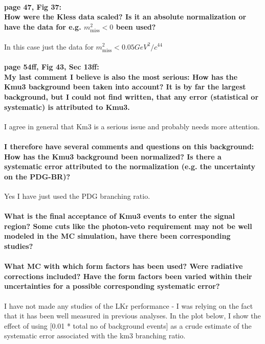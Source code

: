 \documentclass[12pt]{report}
\begin{document}
\paragraph{page 47, Fig 37: \\
    How were the Kless data scaled? Is it an absolute normalization or have the data for e.g. $m_\textrm{miss}^2 < 0$ been used?\\
}
In this case just the data for $m_\textrm{miss}^2 < 0.05 GeV^2/c^44$

\paragraph{page 54ff, Fig 43, Sec 13ff:\\
My last comment I believe is also the most serious: How has the Kmu3 background been taken into account? It is by far the largest background, but I could not find written, that any error (statistical or systematic) is attributed to Kmu3.\\}
I agree in general that Km3 is a serious issue and probably needs more attention.
\paragraph{I therefore  have several comments and questions on this background:
How has the Kmu3 background been normalized? Is there a systematic error attributed to the normalization (e.g. the uncertainty on the PDG-BR)?\\}

Yes I have just used the PDG branching ratio.

\paragraph{What is the final acceptance of Kmu3 events to enter the signal region? Some cuts like the photon-veto requirement may not be well modeled in the MC simulation, have there been corresponding studies?}

\paragraph{What MC with which form factors has been used? Were radiative corrections included? Have the form factors been varied within their uncertainties for a possible corresponding systematic error?}

I have not made any studies of the LKr performance - I was relying on the fact that it has been well measured in previous analyses.
In the plot below, I show the effect of using 
[0.01 * total no of background events] as a crude estimate of the systematic error associated with the km3 branching ratio.
\end{document}
